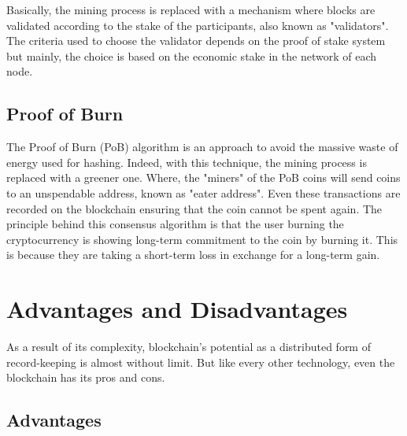 Basically, the mining process is replaced with a mechanism where blocks are
validated according to the stake of the participants, also known as "validators".
The criteria used to choose the validator depends on the proof of stake system
but mainly, the choice is based on the economic stake in the network of 
each node.\cite{binancevision}\cite{consensusmedium}

\subsection{Proof of Burn}
\label{sec:pob}

The Proof of Burn (PoB) algorithm is an approach to avoid the massive 
waste of energy used for hashing. Indeed, with this technique, the mining
process is replaced with a greener one. Where, the "miners" of the PoB 
coins will send coins to an  unspendable address, known as "eater address".
Even these transactions are recorded on the blockchain ensuring that the coin 
cannot be spent again. The principle behind this consensus algorithm is that
the user burning the cryptocurrency is showing long-term commitment to the
coin by burning it. This is because they are taking a short-term loss in 
exchange for a long-term gain.\cite{consensusmedium}




\section{Advantages and Disadvantages}
\label{sec:evaluate}

As a result of its complexity, blockchain's potential as a distributed 
form of record-keeping is almost without limit. But like every other 
technology, even the blockchain has its pros and cons. 

\subsection{Advantages}
\label{sec:advantages}

